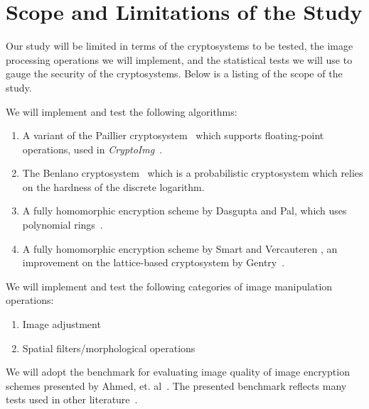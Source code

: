 \section{Scope and Limitations of the Study}
Our study will be limited in terms of the cryptosystems to be tested, the image processing operations we will implement, and the statistical tests we will use to gauge the security of the cryptosystems. Below is a listing of the scope of the study.

We will implement and test the following algorithms:
\begin{enumerate}
	\item A variant of the Paillier cryptosystem~\cite{stern_public-key_1999} which supports floating-point operations, used in \textit{CryptoImg}~\cite{ziad_cryptoimg:_2016}.
	\item The Benlano cryptosystem~\cite{benaloh_dense_1994} which is a probabilistic cryptosystem which relies on the hardness of the discrete logarithm.
	\item A fully homomorphic encryption scheme by Dasgupta and Pal, which uses polynomial rings~\cite{dasgupta_design_2016}.
	\item A fully homomorphic encryption scheme by Smart and Vercauteren \cite{hutchison_fully_2010}, an improvement on the lattice-based cryptosystem by Gentry~\cite{gentry_fully_2009}.
\end{enumerate}
We will implement and test the following categories of image manipulation operations:
\begin{enumerate}
	\item Image adjustment
	\item Spatial filters/morphological operations
\end{enumerate}
We will adopt the benchmark for evaluating image quality of image encryption schemes presented by Ahmed, et. al~\cite{ahmed_benchmark_2016}. The presented benchmark reflects many tests used in other literature~\cite{ahmad_efficiency_2012, wu_npcr_2011}.
